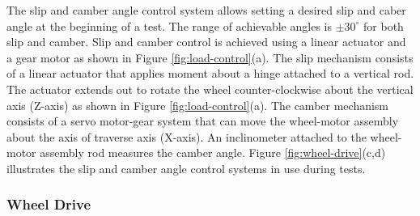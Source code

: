 \documentclass{article}
\begin{document}
The slip and camber angle control system allows setting a desired slip and caber angle at the beginning of a test. The range of achievable angles is $\pm 30^\circ$ for both slip and camber. Slip and camber control is achieved using a linear actuator and a gear motor as shown in Figure \ref{fig:load-control}(a). The slip mechanism consists of a linear actuator that applies moment about a hinge attached to a vertical rod. The actuator extends out to rotate the wheel counter-clockwise about the vertical axis (Z-axis) as shown in Figure \ref{fig:load-control}(a). %
The camber mechanism consists of a servo motor-gear system that can move the wheel-motor assembly about the axis of traverse axis (X-axis). %
An inclinometer attached to the wheel-motor assembly rod measures the camber angle. %
Figure \ref{fig:wheel-drive}(c,d) illustrates the slip and camber angle control systems in use during tests.




\subsubsection{Wheel Drive}
\end{document}
